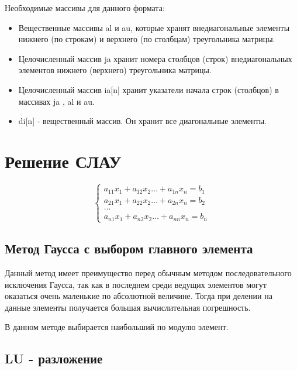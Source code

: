 \documentclass[a4paper,12pt]{article}
\begin{document}
\noindent Необходимые массивы для данного формата:
\begin{itemize}
    \item Вещественные массивы al и au, которые хранят внедиагональные элементы нижнего (по строкам) и верхнего (по столбцам) треугольника матрицы.
    \item Целочисленный массив ja хранит номера столбцов (строк) внедиагональных элементов нижнего (верхнего) треугольника матрицы.
    \item Целочисленный массив ia[n] хранит указатели начала строк (столбцов) в массивах ja , al и au.
    \item di[n] - вещественный массив. Он хранит все диагональные элементы.
\end{itemize}

\section{Решение СЛАУ}
\begin{equation*} 
 \begin{cases}
   a_{11}x_1 + a_{12}x_2 \ldots +  a_{1n}x_n = b_1\\ 
   a_{21}x_1 + a_{22}x_2 \ldots +  a_{2n}x_n = b_2\\ 
   \ldots\\
   a_{n1}x_1 + a_{n2}x_2 \ldots +  a_{nn}x_n = b_n
 \end{cases} 
\end{equation*}
\subsection{Метод Гаусса с выбором главного элемента}
Данный метод имеет преимущество перед обычным методом последовательного исключения Гаусса, так как в последнем среди ведущих элементов могут оказаться очень маленькие по абсолютной величине. Тогда при делении на данные элементы получается большая вычислительная погрешность.

В данном методе выбирается наибольший по модулю элемент.

\subsection{LU -  разложение}
\end{document}
